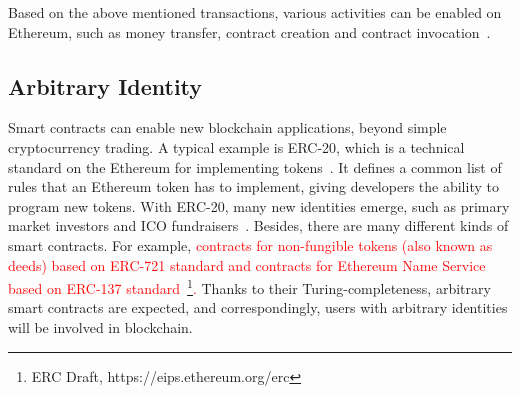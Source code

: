 



Based on the above mentioned transactions, various activities can be enabled on Ethereum, such as money transfer, contract creation and contract invocation~\cite{chen2018infocom}.


\subsection{Arbitrary Identity}
Smart contracts can enable new blockchain applications, beyond simple cryptocurrency trading. A typical example is ERC-20, which is a technical standard on the Ethereum for implementing tokens~\cite{erc-20-wiki}. It defines a common list of rules that an Ethereum token has to implement, giving developers the ability to program new tokens. With ERC-20, many new identities emerge, such as primary market investors and ICO fundraisers~\cite{cerchiello2018icos}. Besides, there are many different kinds of smart contracts. For example, \textcolor{red}{contracts for non-fungible tokens (also known as deeds) based on ERC-721 standard and contracts for Ethereum Name Service based on ERC-137 standard~\footnote{ERC Draft, https://eips.ethereum.org/erc}.} Thanks to their Turing-completeness, arbitrary smart contracts are expected, and correspondingly, users with arbitrary identities will be involved in blockchain.

